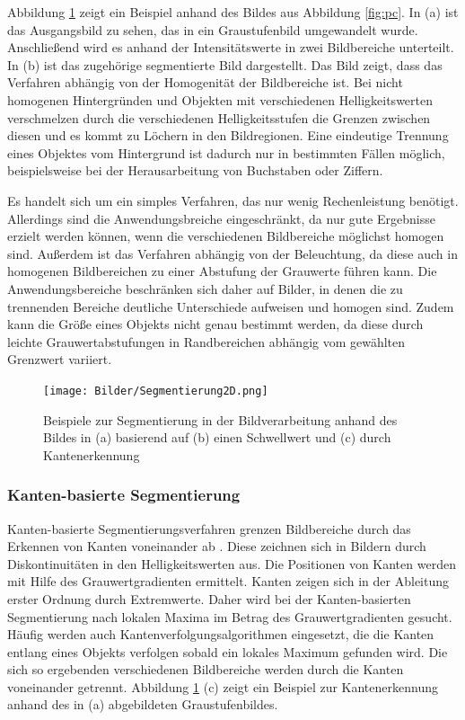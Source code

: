 Abbildung \ref{fig:seg2d} zeigt ein Beispiel anhand des Bildes aus Abbildung \ref{fig:pc}. In (a) ist das Ausgangsbild zu sehen, das in ein Graustufenbild umgewandelt wurde. Anschließend wird es anhand der Intensitätswerte in zwei Bildbereiche unterteilt. In (b) ist das zugehörige segmentierte Bild dargestellt. Das Bild zeigt, dass das Verfahren abhängig von der Homogenität der Bildbereiche ist. Bei nicht homogenen Hintergründen und Objekten mit verschiedenen Helligkeitswerten verschmelzen durch die verschiedenen Helligkeitsstufen die Grenzen zwischen diesen und es kommt zu Löchern in den Bildregionen. Eine eindeutige Trennung eines Objektes vom Hintergrund ist dadurch nur in bestimmten Fällen möglich, beispielsweise bei der Herausarbeitung von Buchstaben oder Ziffern. 

Es handelt sich um ein simples Verfahren, das nur wenig Rechenleistung benötigt. Allerdings sind die Anwendungsbreiche eingeschränkt, da nur gute Ergebnisse erzielt werden können, wenn die verschiedenen Bildbereiche möglichst homogen sind. Außerdem ist das Verfahren abhängig von der Beleuchtung, da diese auch in homogenen Bildbereichen zu einer Abstufung der Grauwerte führen kann. Die An\-wen\-dungs\-be\-rei\-che beschränken sich daher auf Bilder, in denen die zu trennenden Bereiche deutliche Unterschiede aufweisen und homogen sind. Zudem kann die Größe eines Objekts nicht genau bestimmt werden, da diese durch leichte Grauwertabstufungen  in Randbereichen abhängig vom gewählten Grenzwert variiert. 

\begin{figure}
    \centering
    \texttt{[image: Bilder/Segmentierung2D.png]}
    \caption{Beispiele zur Segmentierung in der Bildverarbeitung anhand des Bildes in (a) basierend auf (b) einen Schwellwert und (c) durch Kantenerkennung}
    \label{fig:seg2d}
\end{figure}

\subsubsection[Kanten-basierte Segmentierung (Schmelzer)]{Kanten-basierte Segmentierung}

Kanten-basierte Segmentierungsverfahren grenzen Bildbereiche durch das Erkennen von Kanten voneinander ab  \cite{Jaehne2012}. Diese zeichnen sich in Bildern durch Diskontinuitäten in den Helligkeitswerten aus. Die Positionen von Kanten werden mit Hilfe des Grauwertgradienten ermittelt. Kanten zeigen sich in der Ableitung erster Ordnung durch Extremwerte.
Daher wird bei der Kanten-basierten Segmentierung nach lokalen Maxima im Betrag des Grauwertgradienten gesucht. Häufig werden auch Kantenverfolgungsalgorithmen eingesetzt, die die Kanten entlang eines Objekts verfolgen sobald ein lokales Maximum gefunden wird. Die sich so ergebenden verschiedenen Bild\-be\-rei\-che werden durch die Kanten voneinander getrennt. Abbildung \ref{fig:seg2d} (c) zeigt ein Beispiel zur Kantenerkennung anhand des in (a) abgebildeten Graustufenbildes. 

